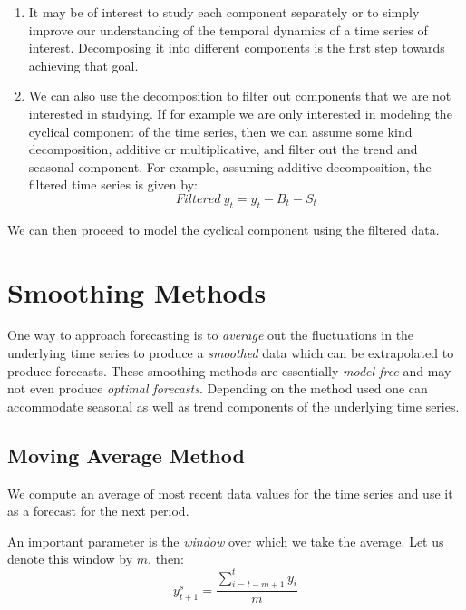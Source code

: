 \documentclass[]{book}
\theoremstyle{definition}
\theoremstyle{definition}
\theoremstyle{definition}
\theoremstyle{remark}
\begin{document}
\begin{enumerate}
\def\labelenumi{\arabic{enumi}.}
\item
  It may be of interest to study each component separately or to simply improve our understanding of the temporal dynamics of a time series of interest. Decomposing it into different components is the first step towards achieving that goal.
\item
  We can also use the decomposition to filter out components that we are not interested in studying. If for example we are only interested in modeling the cyclical component of the time series, then we can assume some kind decomposition, additive or multiplicative, and filter out the trend and seasonal component. For example, assuming additive decomposition, the filtered time series is given by:
  \begin{equation}
  Filtered \ y_t= y_t-B_t-S_t
  \end{equation}
\end{enumerate}

We can then proceed to model the cyclical component using the filtered data.

\hypertarget{smoothing-methods}{%
\chapter{Smoothing Methods}\label{smoothing-methods}}

One way to approach forecasting is to \emph{average} out the fluctuations in the underlying time series to produce a \emph{smoothed} data which can be extrapolated to produce forecasts. These smoothing methods are essentially \emph{model-free} and may not even produce \emph{optimal forecasts}. Depending on the method used one can accommodate seasonal as well as trend components of the underlying time series.

\hypertarget{moving-average-method}{%
\section{Moving Average Method}\label{moving-average-method}}

We compute an average of most recent data values for the time series and use it as a forecast for the next period.

An important parameter is the \emph{window} over which we take the average. Let us denote this window by \(m\), then:
\begin{equation}
    y^s_{t+1}=\frac{\sum \limits_{i=t-m+1}^{t}{y_i}}{m}
    \end{equation}
\end{document}
